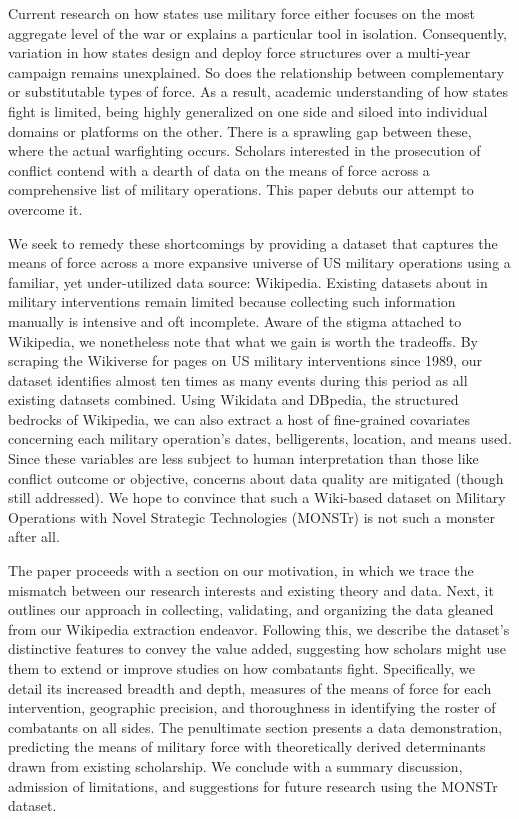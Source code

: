 \documentclass[fleqn,12pt]{article}
\begin{document}
Current research on how states use military force either focuses on the most aggregate level of the war or explains a particular tool in isolation. Consequently, variation in how states design and deploy force structures over a multi-year campaign remains unexplained. So does the relationship between complementary or substitutable types of force. As a result, academic understanding of how states fight is limited, being highly generalized on one side and siloed into individual domains or platforms on the other. There is a sprawling gap between these, where the actual warfighting occurs. Scholars interested in the prosecution of conflict contend with a dearth of data on the means of force across a comprehensive list of military operations. This paper debuts our attempt to overcome it.

We seek to remedy these shortcomings by providing a dataset that captures the means of force across a more expansive universe of US military operations using a familiar, yet under-utilized data source: Wikipedia. Existing datasets about in military interventions remain limited because collecting such information manually is intensive and oft incomplete. Aware of the stigma attached to Wikipedia, we nonetheless note that what we gain is worth the tradeoffs. By scraping the Wikiverse for pages on US military interventions since 1989, our dataset identifies almost ten times as many events during this period as all existing datasets combined. Using Wikidata and DBpedia, the structured bedrocks of Wikipedia, we can also extract a host of fine-grained covariates concerning each military operation's dates, belligerents, location, and means used. Since these variables are less subject to human interpretation than those like conflict outcome or objective, concerns about data quality are mitigated (though still addressed). We hope to convince that such a Wiki-based dataset on Military Operations with Novel Strategic Technologies (MONSTr) is not such a monster after all.
	
The paper proceeds with a section on our motivation, in which we trace the mismatch between our research interests and existing theory and data. Next, it outlines our approach in collecting, validating, and organizing the data gleaned from our Wikipedia extraction endeavor. Following this, we describe the dataset's distinctive features to convey the value added, suggesting how scholars might use them to extend or improve studies on how combatants fight. Specifically, we detail its increased breadth and depth, measures of the means of force for each intervention, geographic precision, and thoroughness in identifying the roster of combatants on all sides. The penultimate section presents a data demonstration, predicting the means of military force with theoretically derived determinants drawn from existing scholarship. We conclude with a summary discussion, admission of limitations, and suggestions for future research using the MONSTr dataset.
\end{document}
